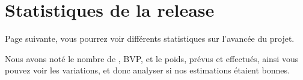 \chapter{Statistiques de la release}\label{stats}
Page suivante, vous pourrez voir différents statistiques sur l'avancée du projet. 

Nous avons noté le nombre de \USs{}, BVP, et le poids, prévus et effectués, ainsi vous pouvez voir 
les variations, et donc analyser si nos estimations étaient bonnes.

